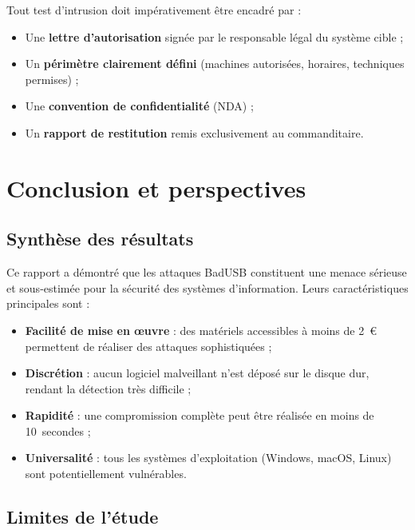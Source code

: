\documentclass[12pt,a4paper]{report}
\begin{document}
Tout test d'intrusion doit impérativement être encadré par :

\begin{itemize}
  \item Une \textbf{lettre d'autorisation} signée par le responsable légal du système cible ;
  \item Un \textbf{périmètre clairement défini} (machines autorisées, horaires, techniques permises) ;
  \item Une \textbf{convention de confidentialité} (NDA) ;
  \item Un \textbf{rapport de restitution} remis exclusivement au commanditaire.
\end{itemize}

\chapter{Conclusion et perspectives}
\label{chap:conclusion}

\section{Synthèse des résultats}

Ce rapport a démontré que les attaques BadUSB constituent une menace sérieuse et sous-estimée pour la sécurité des systèmes d'information. Leurs caractéristiques principales sont :

\begin{itemize}
  \item \textbf{Facilité de mise en \oe uvre} : des matériels accessibles à moins de 2~€ permettent de réaliser des attaques sophistiquées ;
  \item \textbf{Discrétion} : aucun logiciel malveillant n'est déposé sur le disque dur, rendant la détection très difficile ;
  \item \textbf{Rapidité} : une compromission complète peut être réalisée en moins de 10~secondes ;
  \item \textbf{Universalité} : tous les systèmes d'exploitation (Windows, macOS, Linux) sont potentiellement vulnérables.
\end{itemize}

\section{Limites de l'étude}
\end{document}
